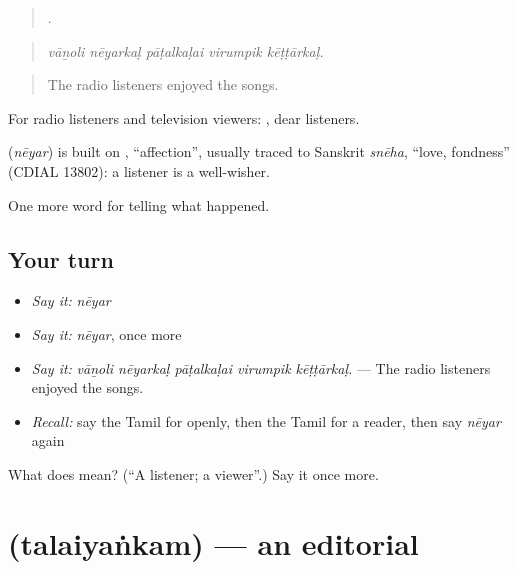 \begin{quote}
    .
\end{quote}

\begin{quote}
\emph{vāṉoli nēyarkaḷ pāṭalkaḷai virumpik kēṭṭārkaḷ.}
\end{quote}

\begin{quote}
The radio listeners enjoyed the songs.
\end{quote}

For radio listeners and television viewers:  , dear listeners.

\begin{cousinweb}
\textbf{} (\emph{nēyar}) is built on , \textquotedblleft{}affection\textquotedblright{}, usually traced to Sanskrit \emph{snēha}, \textquotedblleft{}love, fondness\textquotedblright{} (CDIAL 13802): a listener is a well-wisher.
\end{cousinweb}

\begin{grammarlens}[title={What you've built}]
One more word for telling what happened.
\end{grammarlens}

\subsection*{Your turn}
\begin{itemize}
\raggedright
  \item \emph{Say it:} \emph{nēyar}
  \item \emph{Say it:} \emph{nēyar}, once more
  \item \emph{Say it:} \emph{vāṉoli nēyarkaḷ pāṭalkaḷai virumpik kēṭṭārkaḷ.} — The radio listeners enjoyed the songs.
  \item \emph{Recall:} say the Tamil for openly, then the Tamil for a reader, then say \emph{nēyar} again
\end{itemize}

\begin{tcolorbox}[breakable,colback=teal!4,colframe=teal!35!black,title={Before you move on}]
What does  mean? (\textquotedblleft{}A listener; a viewer\textquotedblright{}.) Say it once more.
\end{tcolorbox}
\section[\texorpdfstring{\ta{தலையங்கம்} (talaiyaṅkam)}{தலையங்கம் (talaiyaṅkam)}]{ (talaiyaṅkam) — an editorial}

